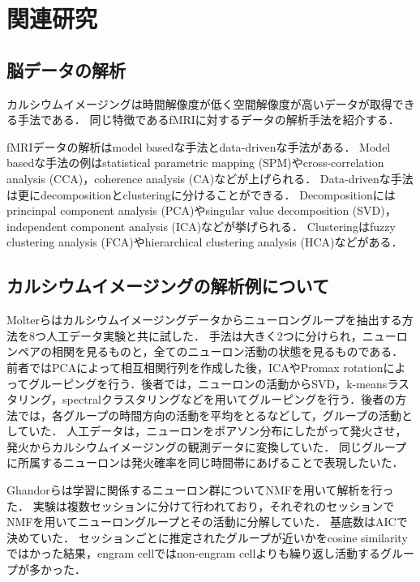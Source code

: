 \section{関連研究}
\subsection{脳データの解析}
カルシウムイメージングは時間解像度が低く空間解像度が高いデータが取得できる手法である．
同じ特徴であるfMRIに対するデータの解析手法を紹介する．

fMRIデータの解析はmodel basedな手法とdata-drivenな手法がある\cite{Li2009}．
Model basedな手法の例はstatistical parametric mapping (SPM)やcross-correlation analysis (CCA)，coherence analysis (CA)などが上げられる．
Data-drivenな手法は更にdecompositionとclusteringに分けることができる．
Decompositionにはprincinpal component analysis (PCA)やsingular value decomposition (SVD)，independent component analysis (ICA)などが挙げられる．
Clusteringはfuzzy clustering analysis (FCA)やhierarchical clustering analysis (HCA)などがある．

\subsection{カルシウムイメージングの解析例について}
Molterらはカルシウムイメージングデータからニューロングループを抽出する方法を8つ人工データ実験と共に試した\cite{Molter2018}．
手法は大きく2つに分けられ，ニューロンペアの相関を見るものと，全てのニューロン活動の状態を見るものである．
前者ではPCAによって相互相関行列を作成した後，ICAやPromax rotationによってグルーピングを行う．後者では，ニューロンの活動からSVD，k-meansラスタリング，spectralクラスタリングなどを用いてグルーピングを行う．後者の方法では，各グループの時間方向の活動を平均をとるなどして，グループの活動としていた．
人工データは，ニューロンをポアソン分布にしたがって発火させ，発火からカルシウムイメージングの観測データに変換していた．
同じグループに所属するニューロンは発火確率を同じ時間帯にあげることで表現したいた．

Ghandorらは学習に関係するニューロン群についてNMFを用いて解析を行った\cite{Ghandour2019}．
実験は複数セッションに分けて行われており，それぞれのセッションでNMFを用いてニューロングループとその活動に分解していた．
基底数はAICで決めていた．
セッションごとに推定されたグループが近いかをcosine similarityではかった結果，engram cellではnon-engram cellよりも繰り返し活動するグループが多かった．
